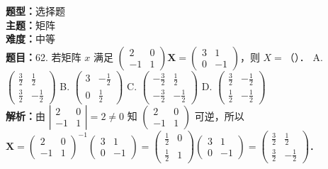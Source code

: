 \documentclass{ctexart}
\newenvironment{question}[5]{%
	\noindent\textbf{题型：}#1\\
	\textbf{主题：}#2\\
	\textbf{难度：}#3\\
	\textbf{题目：}#4\\
	\textbf{解析：}#5\\
	\vspace{1em}
}{}
\begin{document}
	\begin{question}
		{选择题}
		{矩阵}
		{中等}
		{62. 若矩阵 \(x\) 满足 \(\left(\begin{array}{cc}2 & 0 \\ -1 & 1\end{array}\right) \mathbf{X}=\left(\begin{array}{cc}3 & 1 \\ 0 & -1\end{array}\right)\)，则 \(X=\)（）．
			A. \(\left(\begin{array}{cc}\frac{3}{2} & \frac{1}{2} \\ \frac{3}{2} & -\frac{1}{2}\end{array}\right)\)
			B. \(\left(\begin{array}{rr}3 & -\frac{1}{2} \\ 0 & \frac{1}{2}\end{array}\right)\)
			C. \(\left(\begin{array}{cc}-\frac{3}{2} & \frac{1}{2} \\ -\frac{3}{2} & -\frac{1}{2}\end{array}\right)\)
			D. \(\left(\begin{array}{ll}\frac{3}{2} & -\frac{1}{2} \\ \frac{1}{2} & -\frac{1}{2}\end{array}\right)\)}
		{由 \(\left|\begin{array}{cc}2 & 0 \\ -1 & 1\end{array}\right|=2 \neq 0\) 知 \(\left(\begin{array}{cc}2 & 0 \\ -1 & 1\end{array}\right)\) 可逆，所以 \(\mathbf{X}=\left(\begin{array}{cc}2 & 0 \\ -1 & 1\end{array}\right)^{-1}\left(\begin{array}{cc}3 & 1 \\ 0 & -1\end{array}\right)=\left(\begin{array}{ll}\frac{1}{2} & 0 \\ \frac{1}{2} & 1\end{array}\right)\left(\begin{array}{cc}3 & 1 \\ 0 & -1\end{array}\right)=\left(\begin{array}{cc}\frac{3}{2} & \frac{1}{2} \\ \frac{3}{2} & -\frac{1}{2}\end{array}\right)\)．}
	\end{question}
	
\end{document}
